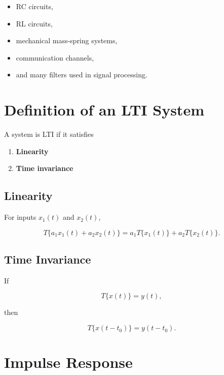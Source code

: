 \begin{itemize}
\item RC circuits,
\item RL circuits,
\item mechanical mass-spring systems,
\item communication channels,
\item and many filters used in signal processing.
\end{itemize}


\section{Definition of an LTI System}

A system is LTI if it satisfies

\begin{enumerate}
\item \textbf{Linearity}
\item \textbf{Time invariance}
\end{enumerate}


\subsection{Linearity}

For inputs \(x_1(t)\) and \(x_2(t)\),

\[
T\{a_1x_1(t)+a_2x_2(t)\}
=
a_1T\{x_1(t)\}+a_2T\{x_2(t)\}.
\]


\subsection{Time Invariance}

If

\[
T\{x(t)\}=y(t),
\]

then

\[
T\{x(t-t_0)\}=y(t-t_0).
\]


\section{Impulse Response}

